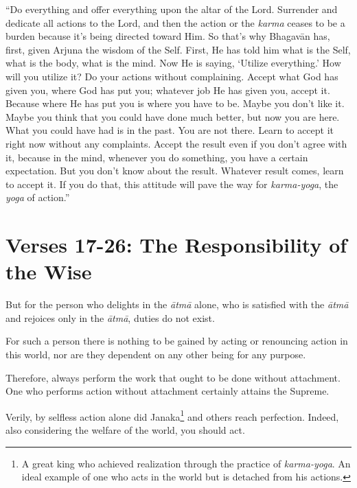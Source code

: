 \enquote{Do everything and offer everything upon the altar of the Lord. Surrender and dedicate all actions to the Lord, and then the action or the \textit{karma} ceases to be a burden because it’s being directed toward Him. So that’s why Bhagavān has, first, given Arjuna the wisdom of the Self. First, He has told him what is the Self, what is the body, what is the mind. Now He is saying, \enquote{Utilize everything.} How will you utilize it? Do your actions without complaining. Accept what God has given you, where God has put you; whatever job He has given you, accept it. Because where He has put you is where you have to be. Maybe you don’t like it. Maybe you think that you could have done much better, but now you are here. What you could have had is in the past. You are not there. Learn to accept it right now without any complaints. Accept the result even if you don’t agree with it, because in the mind, whenever you do something, you have a certain expectation. But you don’t know about the result. Whatever result comes, learn to accept it. If you do that, this attitude will pave the way for \textit{karma-yoga}, the \textit{yoga} of action.}

\section{Verses 17-26: The Responsibility of the Wise}\label{sec-verses-17-26-the-responsibility-of-the-wise}
{But for the person who delights in the \textit{ātmā} alone, who is satisfied with the \textit{ātmā} and rejoices only in the \textit{ātmā}, duties do not exist.}

{For such a person there is nothing to be gained by acting or renouncing action in this world, nor are they dependent on any other being for any purpose.}

{Therefore, always perform the work that ought to be done without attachment. One who performs action without attachment certainly attains the Supreme.}

{Verily, by selfless action alone did Janaka\footnote{A great king who achieved realization through the practice of \textit{karma-yoga}. An ideal example of one who acts in the world but is detached from his actions.} and others reach perfection. Indeed, also considering the welfare of the world, you should act.}

